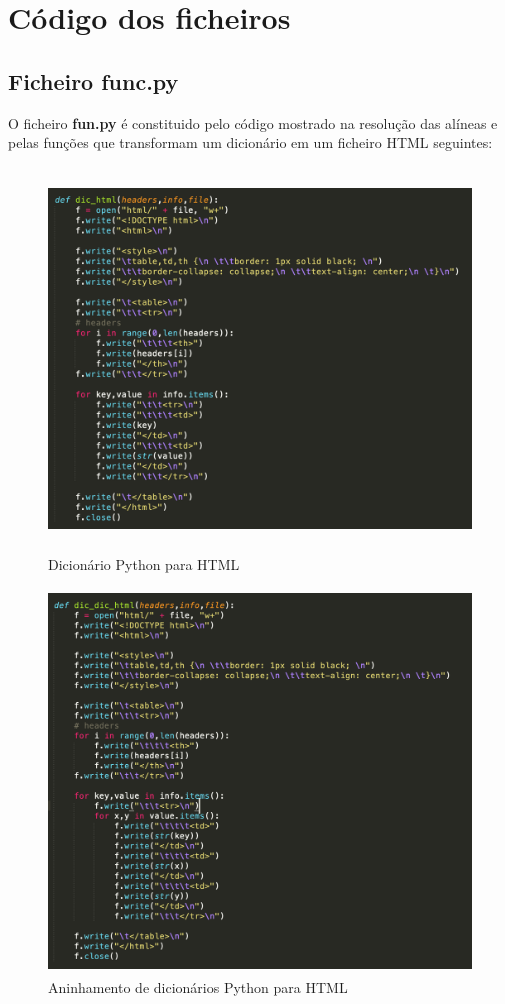 \documentclass[a4paper, 12pt]{article}
\begin{document}
\newpage
\section{Código dos ficheiros}
\subsection{Ficheiro func.py}
O ficheiro \textbf{fun.py} é constituido pelo código mostrado na resolução das alíneas e pelas funções que transformam um dicionário em um ficheiro HTML seguintes:
\begin{figure}[H]
    \centering
    \includegraphics[height=4in]{dic1.png}
    \caption{Dicionário Python para HTML}
    \label{fig:my_label}
\end{figure}
\begin{figure}[H]
    \centering
    \includegraphics[height=4in]{dicdic.png}
    \caption{Aninhamento de dicionários Python para HTML}
    \label{fig:my_label}
\end{figure}
\newpage
\end{document}
